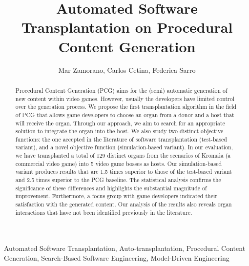 \documentclass[lettersize,journal]{IEEEtran}
\title{Automated Software Transplantation on Procedural Content Generation}
\author{Mar Zamorano, Carlos Cetina, Federica Sarro}
\newcommand{\CaseStudy}{Kromaia}
\begin{document}
\maketitle

\begin{abstract}
Procedural Content Generation (PCG) aims for the (semi) automatic generation of new content within video games. However, usually the developers have limited control over the generation process.
We propose the first transplantation algorithm in the field of PCG that allows game developers to choose an organ from a donor and a host that will receive the organ. Through our approach, we aim to search for an appropriate solution to integrate the organ into the host. We also study two distinct objective functions: the one accepted in the literature of  software transplantation (test-based variant), and a novel objective function (simulation-based variant).
In our evaluation, we have transplanted a total of 129 distinct organs from the scenarios of \CaseStudy{} (a commercial video game) into 5 video game bosses as hosts.
Our simulation-based variant produces results that are 1.5 times superior to those of the test-based variant and 2.5 times superior to the PCG baseline. The statistical analysis confirms the significance of these differences and highlights the substantial magnitude of improvement.
Furthermore, a focus group with game developers indicated their satisfaction with the generated content.
Our analysis of the results also reveals organ interactions that have not been  identified previously in the literature.
\end{abstract}

\begin{IEEEkeywords}
Automated Software Transplantation, Auto-transplantation, Procedural Content Generation, Search-Based Software Engineering, Model-Driven Engineering
\end{IEEEkeywords}














\end{document}
